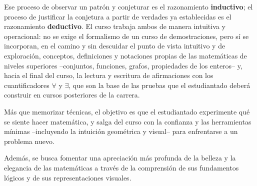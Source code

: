 \begin{refsection}
Ese proceso de observar un patrón y conjeturar es el razonamiento
\textbf{inductivo}; el proceso de justificar la conjetura a partir de
verdades ya establecidas es el razonamiento \textbf{deductivo}. El
curso trabaja ambos de manera intuitiva y operacional: no se exige el
formalismo de un curso de demostraciones, pero sí se incorporan, en el
camino y sin descuidar el punto de vista intuitivo y de exploración,
conceptos, definiciones y notaciones propias de las matemáticas de
niveles superiores --conjuntos, funciones, grafos, propiedades de los
enteros-- y, hacia el final del curso, la lectura y escritura de
afirmaciones con los cuantificadores $\forall$ y $\exists$, que son la
base de las pruebas que el estudiantado deberá construir en cursos
posteriores de la carrera.

Más que memorizar técnicas, el objetivo es que el estudiantado
experimente qué se siente hacer matemática, y salga del curso con la
confianza y las herramientas mínimas --incluyendo la intuición
geométrica y visual-- para enfrentarse a un problema nuevo.

Además, se busca fomentar una apreciación más profunda de la belleza
y la elegancia de las matemáticas a través de la comprensión de sus
fundamentos lógicos y de sus representaciones visuales.





\end{refsection}
